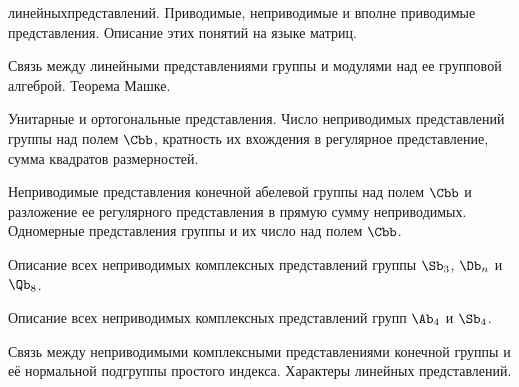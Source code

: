 \documentclass[a4paper]{article}
\begin{document}
\begin{nums}{-3.5}
линейных\break представлений. Приводимые, неприводимые и вполне приводимые представления.
Описание этих понятий на языке матриц.
\item Связь между линейными представлениями группы и модулями над ее групповой
алгеброй. Теорема Машке.
\item Унитарные и ортогональные представления. Число неприводимых представлений группы над полем $\Cbb$, кратность их
вхождения в регулярное представление, сумма квадратов размерностей.
\item Неприводимые представления конечной абелевой группы над полем $\Cbb$
и разложение ее регулярного представления в прямую сумму неприводимых. Одномерные представления группы и их число над полем $\Cbb$.
\item Описание всех неприводимых комплексных представлений группы $\Sb_3$, $\Db_n$ и $\Qb_8$.
\item Описание всех неприводимых комплексных представлений групп $\Ab_4$ и $\Sb_4$.
\item Связь между неприводимыми комплексными представлениями конечной группы и её
нормальной подгруппы простого индекса. Характеры линейных представлений.
\end{nums}

\medskip\dmvntrail
\end{document}
